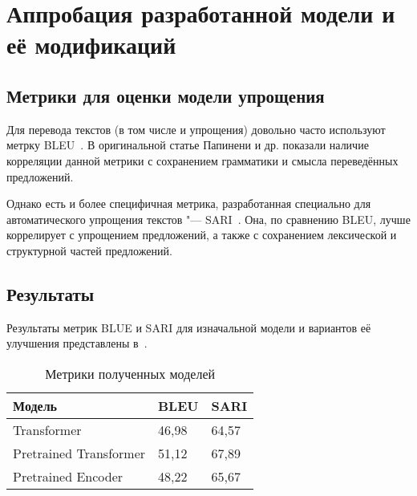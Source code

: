 

\chapter{Аппробация разработанной модели и её модификаций}


\section{Метрики для оценки модели упрощения}


Для перевода текстов (в том числе и упрощения) довольно часто используют метрку BLEU~\cite{BLEU}.
В оригинальной статье Папинени и др. показали наличие корреляции данной метрики с сохранением грамматики и смысла переведённых предложений.

Однако есть и более специфичная метрика, разработанная специально для автоматического упрощения текстов "--- SARI~\cite{SARI}.
Она, по сравнению BLEU, лучше коррелирует с упрощением предложений, а также с сохранением лексической и структурной частей предложений.


\section{Результаты}


Результаты метрик BLUE и SARI для изначальной модели и вариантов её улучшения представлены в~.

\begin{table}[H]%
  \centering\small
  \caption{Метрики полученных моделей}
  \label{metrics}
    \begin{tabular}{|l|l|l|}
      \hline
      \textbf{Модель} & \textbf{BLEU} & \textbf{SARI} \\ \hline
      Transformer & 46{,}98 & 64{,}57 \\ \hline
      Pretrained Transformer & 51{,}12 & 67{,}89 \\ \hline
      Pretrained Encoder & 48{,}22 & 65{,}67 \\ \hline
    \end{tabular}
    \normalsize
\end{table}

